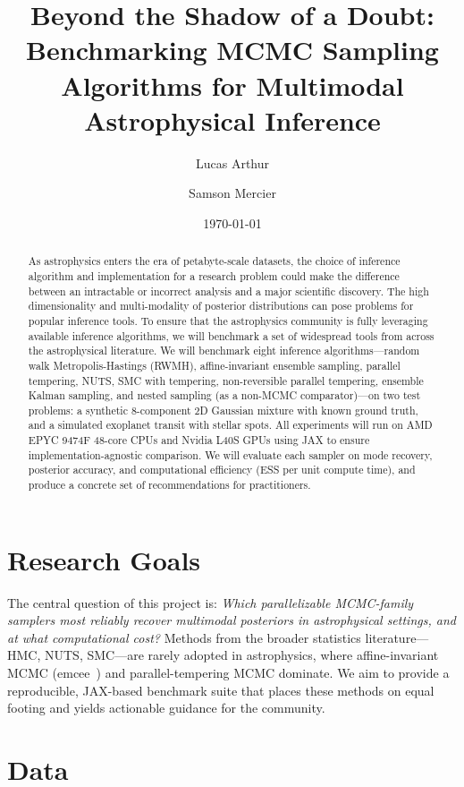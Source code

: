 \documentclass{article}
\title{Beyond the Shadow of a Doubt: Benchmarking MCMC Sampling Algorithms for Multimodal Astrophysical Inference}
\author{Lucas Arthur \and Samson Mercier}
\date{\today}
\begin{document}
\maketitle

\begin{abstract}
As astrophysics enters the era of petabyte-scale datasets, the choice of inference algorithm and implementation for a research problem could make the difference between an intractable or incorrect analysis and a major scientific discovery. The high dimensionality and multi-modality of posterior distributions can pose problems for popular inference tools. To ensure that the astrophysics community is fully leveraging available inference algorithms, we will benchmark a set of widespread tools from across the astrophysical literature. We will benchmark eight inference algorithms---random walk Metropolis-Hastings (RWMH), affine-invariant ensemble sampling, parallel tempering, NUTS, SMC with tempering, non-reversible parallel tempering, ensemble Kalman sampling, and nested sampling (as a non-MCMC comparator)---on two test problems: a synthetic 8-component 2D Gaussian mixture with known ground truth, and a simulated exoplanet transit with stellar spots. All experiments will run on AMD EPYC 9474F 48-core CPUs and Nvidia L40S GPUs using JAX to ensure implementation-agnostic comparison. We will evaluate each sampler on mode recovery, posterior accuracy, and computational efficiency (ESS per unit compute time), and produce a concrete set of recommendations for practitioners.
\end{abstract}

\section*{Research Goals}

The central question of this project is: \textit{Which parallelizable MCMC-family samplers most reliably recover multimodal posteriors in astrophysical settings, and at what computational cost?} Methods from the broader statistics literature---HMC, NUTS, SMC---are rarely adopted in astrophysics, where affine-invariant MCMC \cite{goodman2010} (emcee~\cite{emcee}) and parallel-tempering MCMC dominate. We aim to provide a reproducible, JAX-based benchmark suite that places these methods on equal footing and yields actionable guidance for the community.

\section*{Data}
\end{document}
